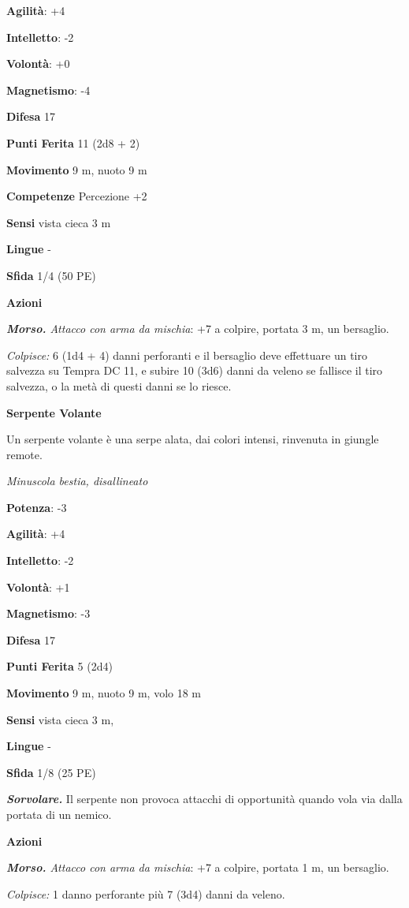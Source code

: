 \begin{multicols}{2}
\textbf{Agilità}: +4

\textbf{Intelletto}: -2

\textbf{Volontà}: +0

\textbf{Magnetismo}: -4

\textbf{Difesa} 17

\textbf{Punti Ferita} 11 (2d8 + 2)

\textbf{Movimento} 9 m, nuoto 9 m

\textbf{Competenze} Percezione +2

\textbf{Sensi} vista cieca 3 m

\textbf{Lingue} -

\textbf{Sfida} 1/4 (50 PE)\smallskip

\smallskip\textbf{Azioni}

\emph{\textbf{Morso.} Attacco con arma da mischia}: +7 a colpire,
portata 3 m, un bersaglio.

\emph{Colpisce:} 6 (1d4 + 4) danni perforanti e il bersaglio deve
effettuare un tiro salvezza su Tempra DC 11, e subire 10 (3d6)
danni da veleno se fallisce il tiro salvezza, o la metà di questi danni
se lo riesce.

\textbf{Serpente Volante}

Un serpente volante è una serpe alata, dai colori intensi, rinvenuta in
giungle remote.

\emph{Minuscola bestia, disallineato}

\textbf{Potenza}: -3

\textbf{Agilità}: +4

\textbf{Intelletto}: -2

\textbf{Volontà}: +1

\textbf{Magnetismo}: -3

\textbf{Difesa} 17

\textbf{Punti Ferita} 5 (2d4)

\textbf{Movimento} 9 m, nuoto 9 m, volo 18 m

\textbf{Sensi} vista cieca 3 m, 

\textbf{Lingue} -

\textbf{Sfida} 1/8 (25 PE)\smallskip

\emph{\textbf{Sorvolare.}} Il serpente non provoca attacchi di
opportunità quando vola via dalla portata di un nemico.

\smallskip\textbf{Azioni}

\emph{\textbf{Morso.} Attacco con arma da mischia}: +7 a colpire,
portata 1 m, un bersaglio.

\emph{Colpisce:} 1 danno perforante più 7 (3d4) danni da veleno.


\end{multicols}
